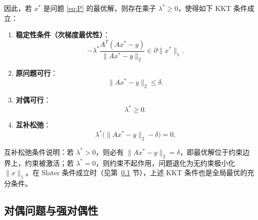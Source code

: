 \documentclass[UTF8]{ctexart}
\numberwithin{figure}{section}
\theoremstyle{definition}
\theoremstyle{examplestyle}
\theoremstyle{remark}
\begin{document}
因此，若 $x^*$ 是问题 \eqref{eq:P} 的最优解，则存在乘子 $\lambda^*\ge0$，使得如下 KKT 条件成立：
\begin{enumerate}
\item \textbf{稳定性条件（次梯度最优性）}：
\begin{equation}
\label{eq:kkt-stationarity}
-\lambda^*\frac{A^T(Ax^*-y)}{\|Ax^*-y\|_2}\in\partial\|x^*\|_1.
\end{equation}
\item \textbf{原问题可行}：
\[
\|Ax^*-y\|_2\le\delta.
\]
\item \textbf{对偶可行}：
\[
\lambda^*\ge0.
\]
\item \textbf{互补松弛}：
\begin{equation}
\label{eq:kkt-complementarity}
\lambda^*\bigl(\|Ax^*-y\|_2-\delta\bigr)=0.
\end{equation}
\end{enumerate}

互补松弛条件说明：若 $\lambda^*>0$，则必有 $\|Ax^*-y\|_2=\delta$，即最优解位于约束边界上，约束被激活；若 $\lambda^*=0$，则约束不起作用，问题退化为无约束极小化 $\|x\|_1$。在 Slater 条件成立时（见第~\ref{sec:dual} 节），上述 KKT 条件也是全局最优的充分条件。

\subsection{对偶问题与强对偶性}
\label{sec:dual}
\end{document}
